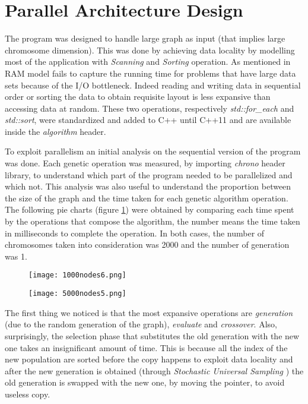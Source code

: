 \section{Parallel Architecture Design}
The program was designed to handle large graph as input (that implies large chromosome dimension). This was done by achieving data locality by modelling most of the application with \textit{Scanning} and \textit{Sorting} operation. As mentioned in \cite{algo-eng} RAM model fails to capture the running time for problems that have large data sets because of the I/O bottleneck. Indeed reading and writing data in sequential order or sorting the data to obtain requisite layout is less expansive than accessing data at random. These two operations, respectively \textit{std::for\_each} and \textit{std::sort}, were standardized and added to C++ until C++11 and are available inside the \textit{algorithm} header.

To exploit parallelism an initial analysis on the sequential version of the program was done. Each genetic operation was measured, by importing \textit{chrono} header library, to understand which part of the program needed to be parallelized and which not. This analysis was also useful to understand the proportion between the size of the graph and the time taken for each genetic algorithm operation. The following pie charts (figure \ref{fig:pie-chart-times}) were obtained by comparing each time spent by the operations that compose the algorithm, the number means the time taken in milliseconds to complete the operation. In both cases, the number of chromosomes taken into consideration was 2000 and the number of generation was 1.
\vspace{1.7em}

\begin{figure}[H]
	\centering
	\begin{minipage}[t]{0.55\linewidth}
		\texttt{[image: 1000nodes6.png]}
		\vspace{0.2em}
	\end{minipage}%
	\begin{minipage}[t]{0.57\linewidth}
		\texttt{[image: 5000nodes5.png]}
		\vspace{0.1em}
	\end{minipage}
    \caption{}\label{fig:pie-chart-times}
\end{figure}

The first thing we noticed is that the most expansive operations are \textit{generation} (due to the random generation of the graph), \textit{evaluate} and \textit{crossover}.  Also, surprisingly, the selection phase that substitutes the old generation with the new one takes an insignificant amount of time. This is because all the index of the new population are sorted before the copy happens to exploit data locality and after the new generation is obtained (through \textit{Stochastic Universal Sampling} \cite{genetic-algorithm-tutorial}) the old generation is swapped with the new one, by moving the pointer, to avoid useless copy. 
\label{sez:architecture}

